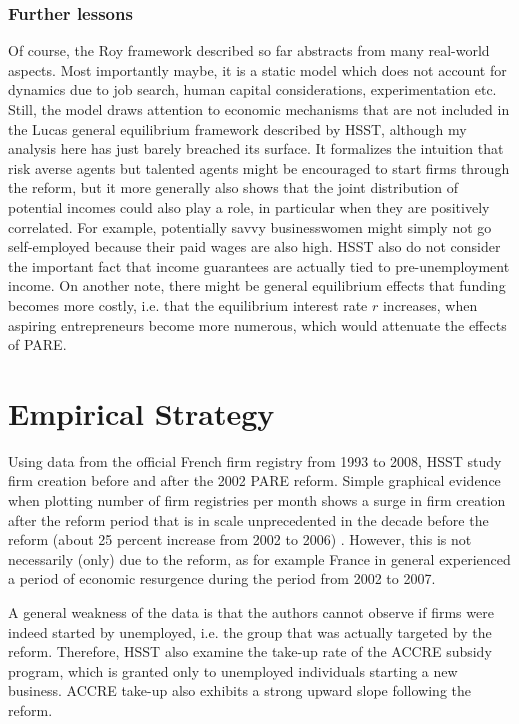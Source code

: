 \subsubsection*{Further lessons}

Of course, the Roy framework described so far abstracts from many real-world aspects. Most importantly maybe, it is a static model which does not account for dynamics due to job search, human capital considerations, experimentation etc. Still, the model draws attention to economic mechanisms that are not included in the Lucas general equilibrium framework described by HSST, although my analysis here has just barely breached its surface. It formalizes the intuition that risk averse agents but talented agents might be encouraged to start firms through the reform, but it more generally also shows that the joint distribution of potential incomes could also play a role, in particular when they are positively correlated. For example, potentially savvy businesswomen might simply not go self-employed because their paid wages are also high. HSST also do not consider the important fact that income guarantees are actually tied to pre-unemployment income. On another note, there might be general equilibrium effects that funding becomes more costly, i.e. that the equilibrium interest rate $r$ increases, when aspiring entrepreneurs become more numerous, which would attenuate the effects of PARE.


\section{Empirical Strategy}

\noindent Using data from the official French firm registry from 1993 to 2008, HSST study firm creation before and after the 2002 PARE reform. Simple graphical evidence when plotting number of firm registries per month shows a surge in firm creation after the reform period that is in scale unprecedented in the decade before the reform (about 25 percent increase from 2002 to 2006) . However, this is not necessarily (only) due to the reform, as for example France in general experienced a period of economic resurgence during the period from 2002 to 2007. 

A general weakness of the data is that the authors cannot observe if firms were indeed started by unemployed, i.e. the group that was actually targeted by the reform. Therefore, HSST also examine the take-up rate of the ACCRE subsidy program, which is granted only to unemployed individuals starting a new business. ACCRE take-up also exhibits a strong upward slope following the reform.  \newline

